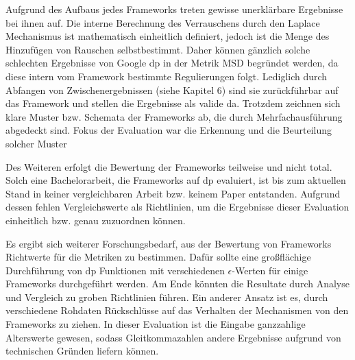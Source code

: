 Aufgrund des Aufbaus jedes Frameworks treten gewisse unerklärbare Ergebnisse bei ihnen auf. Die interne Berechnung des Verrauschens durch den Laplace Mechanismus ist mathematisch einheitlich definiert, jedoch ist die Menge des Hinzufügen von Rauschen selbstbestimmt. Daher können gänzlich solche schlechten Ergebnisse von Google \gls{dp} in der Metrik MSD begründet werden, da diese intern vom Framework bestimmte Regulierungen folgt. Lediglich durch Abfangen von Zwischenergebnissen (siehe Kapitel 6) sind sie zurückführbar auf das Framework und stellen die Ergebnisse als valide da. Trotzdem zeichnen sich klare Muster bzw. Schemata der Frameworks ab, die durch Mehrfachausführung abgedeckt sind. Fokus der Evaluation war die Erkennung und die Beurteilung solcher Muster

Des Weiteren erfolgt die Bewertung der Frameworks teilweise und nicht total. Solch eine Bachelorarbeit, die Frameworks auf \gls{dp} evaluiert, ist bis zum aktuellen Stand in keiner vergleichbaren Arbeit bzw. keinem Paper entstanden. Aufgrund dessen fehlen Vergleichswerte als Richtlinien, um die Ergebnisse dieser Evaluation einheitlich bzw. genau zuzuordnen können. 

Es ergibt sich weiterer Forschungsbedarf, aus der Bewertung von Frameworks Richtwerte für die Metriken zu bestimmen. Dafür sollte eine großflächige Durchführung von \gls{dp} Funktionen mit verschiedenen $\epsilon$-Werten für einige Frameworks durchgeführt werden. Am Ende könnten die Resultate durch Analyse und Vergleich zu groben Richtlinien führen. Ein anderer Ansatz ist es, durch verschiedene Rohdaten Rückschlüsse auf das Verhalten der Mechanismen von den Frameworks zu ziehen. In dieser Evaluation ist die Eingabe ganzzahlige Alterswerte gewesen, sodass Gleitkommazahlen andere Ergebnisse aufgrund von technischen Gründen liefern können.